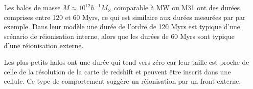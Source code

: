 Les halos de masse $M \approx 10^{12} h^{-1}M_\odot$ comparable à MW ou M31 ont des durées comprises entre 120 et 60 Myrs, ce qui est similaire aux durées mesurées par \cite{ocvirk_reionization_2014} par exemple.
Dans leur modèle une durée de l'ordre de 120 Myrs est typique d'une scénario de réionisation interne, alors que les durées de 60 Myrs sont typique d'une réionisation externe.

Les plus petits halos ont une durée qui tend vers zéro car leur taille est proche de celle de la résolution de la carte de redshift et peuvent être inscrit dans une cellule.
Ce type de comportement suggère un réionisation par un front externe.




%
%


